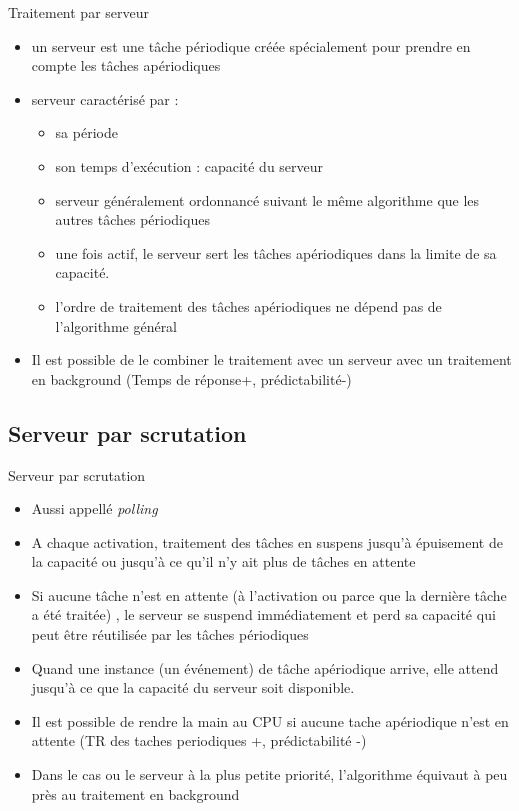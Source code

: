 \begin{frame}{Traitement par serveur} 
  \begin{itemize}
  \item un  serveur est une  tâche périodique créée  spécialement pour
    prendre en compte les tâches apériodiques
  \item serveur caractérisé par :
    \begin{itemize}
    \item sa période 
    \item son temps d'exécution : capacité du serveur  
    \item serveur  généralement ordonnancé suivant  le même algorithme
      que les autres tâches périodiques
    \item une fois actif, le serveur sert les tâches apériodiques dans
      la limite de sa capacité.
    \item l'ordre de traitement  des tâches apériodiques ne dépend pas
      de l'algorithme général
    \end{itemize}
  \item Il est  possible de le combiner le  traitement avec un serveur
    avec   un   traitement   en   background   (Temps   de   réponse+,
    prédictabilité-)
  \end{itemize}
\end{frame}

\subsection{Serveur par scrutation}

\begin{frame}{Serveur par scrutation}
  \begin{itemize}
  \item Aussi appellé \emph{polling}
  \item A chaque activation,  traitement des tâches en suspens jusqu'à
    épuisement  de la capacité  ou jusqu'à  ce qu'il  n'y ait  plus de
    tâches en attente
  \item Si aucune tâche n'est  en attente (à l'activation ou parce que
    la  dernière  tâche  a  été  traitée)  ,  le  serveur  se  suspend
    immédiatement et perd sa capacité qui peut être réutilisée par les
    tâches périodiques
  \item Quand une instance (un événement) de tâche apériodique arrive,
    elle attend jusqu’à ce que la capacité du serveur soit disponible.
  \item  Il est  possible de  rendre la  main au  CPU si  aucune tache
    apériodique  n'est  en  attente  (TR  des  taches  periodiques  +,
    prédictabilité -)
  \item  Dans  le  cas  ou  le  serveur à  la  plus  petite  priorité,
    l'algorithme équivaut à peu près au traitement en background
  \end{itemize}
\end{frame} 

